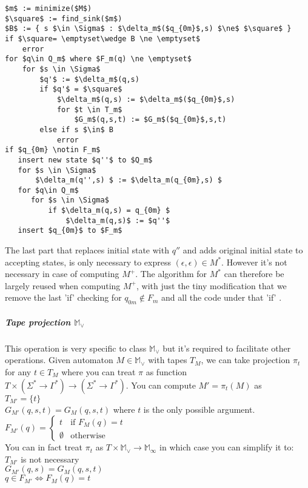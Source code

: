 \documentclass[12pt]{article}
\begin{document}
\begin{lstlisting}
$m$ := minimize($M$)
$\square$ := find_sink($m$)
$B$ := { s $\in \Sigma$ : $\delta_m$($q_{0m}$,s) $\ne$ $\square$ }
if $\square= \emptyset\wedge B \ne \emptyset$
    error
for $q\in Q_m$ where $F_m(q) \ne \emptyset$ 
    for $s \in \Sigma$
        $q'$ := $\delta_m$(q,s)
        if $q'$ = $\square$ 
            $\delta_m$(q,s) := $\delta_m$($q_{0m}$,s)
            for $t \in T_m$
                $G_m$(q,s,t) := $G_m$($q_{0m}$,s,t)
        else if s $\in$ B
            error
if $q_{0m} \notin F_m$
   insert new state $q''$ to $Q_m$
   for $s \in \Sigma$
       $\delta_m(q'',s) $ := $\delta_m(q_{0m},s) $
   for $q\in Q_m$
      for $s \in \Sigma$
          if $\delta_m(q,s) = q_{0m} $
              $\delta_m(q,s)$ := $q''$
   insert $q_{0m}$ to $F_m$
\end{lstlisting}
The last part that replaces initial state with $q''$ and adds original initial state to accepting states, is only necessary to express $(\epsilon,\epsilon) \in M^*$. However it's not necessary in case of computing $M^+$. The algorithm for $M^*$ can therefore be largely reused when computing $M^+$, with just the tiny modification that we remove the last 'if' checking for $q_{0m} \notin F_m$ and all the code under that 'if' .
  

\subparagraph{Tape projection $\mathbb{M}_\vee$} This operation is very specific to class $\mathbb{M}_\vee$ but it's required to facilitate other operations. Given automaton $M \in \mathbb{M}_\vee$ with tapes $T_M$, we can take projection $\pi_t$ for any $t\in T_M$ where you can treat $\pi$ as function $T \times (\Sigma^* \rightarrow \Gamma^*) \rightarrow (\Sigma^* \rightarrow \Gamma^*)$. You can compute $M' = \pi_t(M)$ as \\
 $T_{M'} = \{t\}$ \\
 $G_{M'}(q,s,t) = G_M(q,s,t)$ where $t$ is the only possible argument. \\
 $F_{M'}(q) = \begin{cases}
 t & \mbox{if } F_M(q) = t \\
 \emptyset & \mbox{otherwise}
 \end{cases}$ \\
 You can in fact treat $\pi_t$ as $T \times \mathbb{M}_\vee \rightarrow \mathbb{M}_\infty$ in which case you can simplify it to: \\
  $T_{M'}$ is not necessary \\
 $G_{M'}(q,s) = G_M(q,s,t)$ \\
 $q \in F_{M'} \iff F_M(q) = t$ \\
\end{document}
